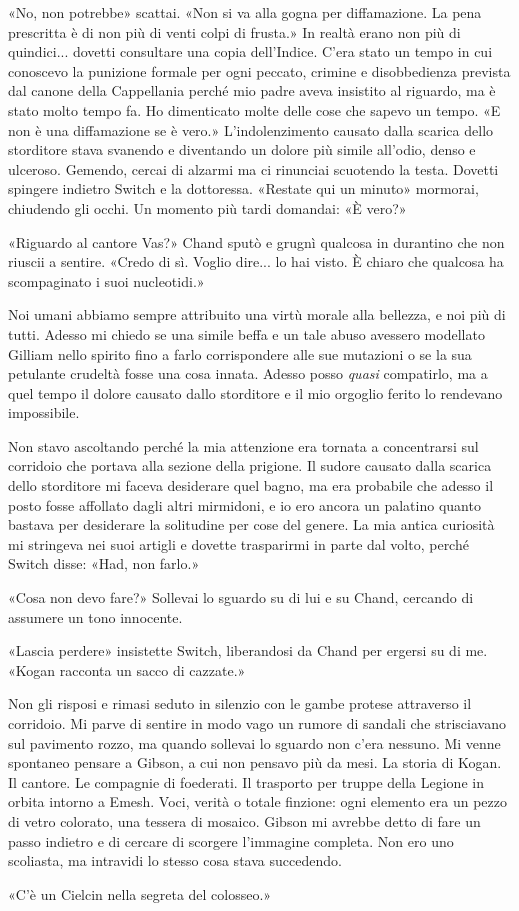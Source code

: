«No, non potrebbe» scattai. «Non si va alla gogna per diffamazione. La
pena prescritta è di non più di venti colpi di frusta.» In realtà erano
non più di quindici... dovetti consultare una copia dell'Indice. C'era
stato un tempo in cui conoscevo la punizione formale per ogni peccato,
crimine e disobbedienza prevista dal canone della Cappellania perché mio
padre aveva insistito al riguardo, ma è stato molto tempo fa. Ho
dimenticato molte delle cose che sapevo un tempo. «E non è una
diffamazione se è vero.» L'indolenzimento causato dalla scarica dello
storditore stava svanendo e diventando un dolore più simile all'odio,
denso e ulceroso. Gemendo, cercai di alzarmi ma ci rinunciai scuotendo
la testa. Dovetti spingere indietro Switch e la dottoressa. «Restate qui
un minuto» mormorai, chiudendo gli occhi. Un momento più tardi domandai:
«È vero?»

«Riguardo al cantore Vas?» Chand sputò e grugnì qualcosa in durantino
che non riuscii a sentire. «Credo di sì. Voglio dire... lo hai visto. È
chiaro che qualcosa ha scompaginato i suoi nucleotidi.»

Noi umani abbiamo sempre attribuito una virtù morale alla bellezza, e
noi più di tutti. Adesso mi chiedo se una simile beffa e un tale abuso
avessero modellato Gilliam nello spirito fino a farlo corrispondere alle
sue mutazioni o se la sua petulante crudeltà fosse una cosa innata.
Adesso posso \emph{quasi} compatirlo, ma a quel tempo il dolore causato
dallo storditore e il mio orgoglio ferito lo rendevano impossibile.

Non stavo ascoltando perché la mia attenzione era tornata a concentrarsi
sul corridoio che portava alla sezione della prigione. Il sudore causato
dalla scarica dello storditore mi faceva desiderare quel bagno, ma era
probabile che adesso il posto fosse affollato dagli altri mirmidoni, e
io ero ancora un palatino quanto bastava per desiderare la solitudine
per cose del genere. La mia antica curiosità mi stringeva nei suoi
artigli e dovette trasparirmi in parte dal volto, perché Switch disse:
«Had, non farlo.»

«Cosa non devo fare?» Sollevai lo sguardo su di lui e su Chand, cercando
di assumere un tono innocente.

«Lascia perdere» insistette Switch, liberandosi da Chand per ergersi su
di me. «Kogan racconta un sacco di cazzate.»

Non gli risposi e rimasi seduto in silenzio con le gambe protese
attraverso il corridoio. Mi parve di sentire in modo vago un rumore di
sandali che strisciavano sul pavimento rozzo, ma quando sollevai lo
sguardo non c'era nessuno. Mi venne spontaneo pensare a Gibson, a cui
non pensavo più da mesi. La storia di Kogan. Il cantore. Le compagnie di
foederati. Il trasporto per truppe della Legione in orbita intorno a
Emesh. Voci, verità o totale finzione: ogni elemento era un pezzo di
vetro colorato, una tessera di mosaico. Gibson mi avrebbe detto di fare
un passo indietro e di cercare di scorgere l'immagine completa. Non ero
uno scoliasta, ma intravidi lo stesso cosa stava succedendo.

«C'è un Cielcin nella segreta del colosseo.»

